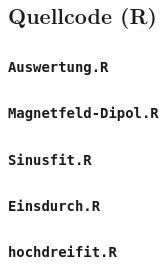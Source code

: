 \documentclass[12pt]{article}
\newcommand{\code}[1]{\texttt{#1}}
\begin{document}



%


\subsection{Quellcode (R)}
\subsubsection{\code{Auswertung.R}}\label{AuswertungR}

\subsubsection{\code{Magnetfeld-Dipol.R}}\label{MagnetfeldR}

\subsubsection{\code{Sinusfit.R}}\label{SinusfitR}

\subsubsection{\code{Einsdurch.R}}\label{EinsdurchR}

\subsubsection{\code{hochdreifit.R}}\label{hochdreifitR}


\newpage
\end{document}

